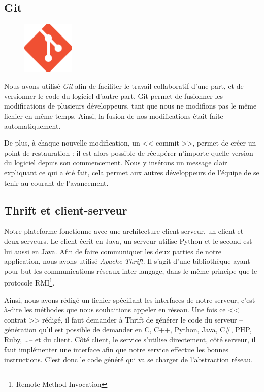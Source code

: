 \subsection{Git}
\begin{figure}
\vspace{-15px}
	\includegraphics[width=2.5cm]{contents/images/logoGit.png}
\end{figure}
Nous avons utilisé \textit{Git} afin de faciliter le travail collaboratif d'une part, et de versionner le code du logiciel d'autre part. Git permet de fusionner les
modifications de plusieurs développeurs, tant que nous ne modifions pas le même fichier en même temps. Ainsi, la fusion de nos modifications était faite automatiquement. 

De plus, à chaque nouvelle modification, un << commit >>, permet de créer un point de restauration : il est alors possible de
récupérer n'importe quelle version du logiciel depuis son commencement. Nous y insérons un message clair expliquant ce qui a été fait, cela permet aux autres développeurs de l'équipe de se tenir au courant de l'avancement.

\subsection{Thrift et client-serveur}\label{thrift}
Notre plateforme fonctionne avec une architecture client-serveur, un client et deux serveurs. Le client écrit en Java, un serveur utilise
Python et le second est lui aussi en Java. Afin de faire communiquer les deux parties de notre application, nous avons utilisé \textit{Apache Thrift}. Il s'agit d'une bibliothèque ayant pour but les communications réseaux inter-langage, dans le même principe que le protocole RMI\footnote{Remote Method Invocation}.

Ainsi, nous avons rédigé un fichier spécifiant les interfaces de notre serveur, c'est-à-dire les méthodes que nous souhaitions appeler en réseau. Une fois ce << contrat >> rédigé, il faut demander à Thrift de générer le code du serveur -- génération qu'il est possible de demander en C, C++, Python, Java, C\#, PHP, Ruby, \ldots -- et du client. Côté client, le service s'utilise directement, côté serveur, il faut implémenter une interface afin que notre service effectue les bonnes instructions. C'est donc le code généré qui va se charger de l'abstraction réseau.

